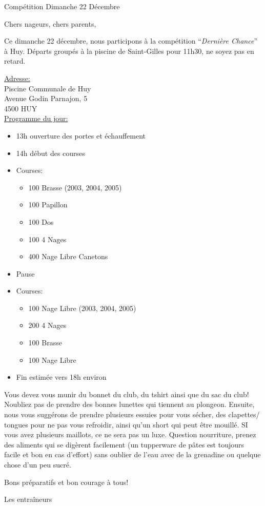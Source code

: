 \documentclass{article}
\begin{document}
\begin{center}\huge{Compétition Dimanche 22 Décembre}\end{center}
\hspace{1cm}

Chers nageurs, chers parents,

Ce dimanche 22 décembre, nous participons à la compétition ``\emph{Dernière Chance}'' à Huy.
Départs groupés à la piscine de Saint-Gilles pour 11h30, ne soyez pas en retard.

\vspace{0.5cm}

\underline{Adresse:}\\
Piscine Communale de Huy\\
Avenue Godin Parnajon, 5\\
4500 HUY\\

\underline{Programme du jour:}
\begin{itemize}
\item 13h ouverture des portes et échauffement
\item 14h début des courses
\item Courses:
\begin{itemize}
\item 100 Brasse (2003, 2004, 2005)
\item 100 Papillon
\item 100 Dos
\item 100 4 Nages
\item 400 Nage Libre Canetons
\end{itemize}
\item Pause
\item Courses:
\begin{itemize}
\item 100 Nage Libre (2003, 2004, 2005)
\item 200 4 Nages
\item 100 Brasse
\item 100 Nage Libre
\end{itemize}
\item Fin estimée vers 18h environ
\end{itemize}

\vspace{1cm}

Vous devez vous munir du bonnet du club, du tshirt ainsi que du sac du club!
Noubliez pas de prendre des bonnes lunettes qui tiennent au plongeon.
Ensuite, nous vous suggérons de prendre plusieurs essuies pour vous sécher, des clapettes/ tongues pour ne pas vous refroidir, ainsi qu’un short qui peut être mouillé. SI vous avez plusieurs maillots, ce ne sera pas un luxe.
Question nourriture, prenez des aliments qui se digèrent facilement (un tupperware de pâtes est toujours facile et bon en cas d’effort) sans oublier de l’eau avec de la grenadine ou quelque chose d’un peu sucré.

Bons préparatifs et bon courage à tous!

Les entraîneurs
\end{document}
